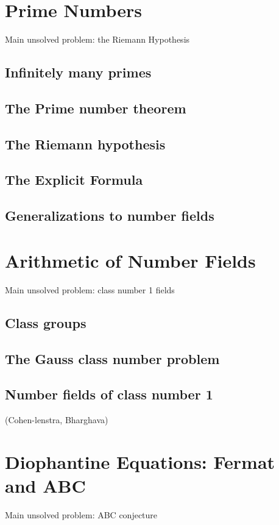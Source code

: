 \documentclass{book}
\theoremstyle{plain}
\theoremstyle{definition}
\numberwithin{equation}{section}
\numberwithin{figure}{section}
\numberwithin{table}{section}
\begin{document}
\chapter{Prime Numbers}

Main unsolved problem: the Riemann Hypothesis



\section{Infinitely many primes}
\section{The Prime number theorem}
\section{The Riemann hypothesis}
\section{The Explicit Formula}
\section{Generalizations to number fields}


\chapter{Arithmetic of Number Fields}
Main unsolved problem: class number 1 fields

\section{Class groups}
\section{The Gauss class number problem}
\section{Number fields of class number 1}
 (Cohen-lenstra, Bharghava)



\chapter{Diophantine Equations: Fermat and ABC}
Main unsolved problem: ABC conjecture
\end{document}
